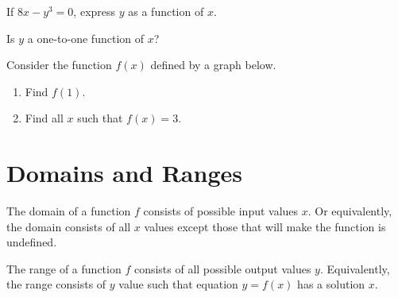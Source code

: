 \begin{exercise}
  If \(8x-y^3=0\), express \(y\) as a function of \(x\).

  Is $y$ a one-to-one function of $x$?
\end{exercise}


\begin{exercise}
  Consider the function $f(x)$ defined by a graph below.

  \begin{multicols}{2}
    \begin{enumerate}
      \item Find $f(1)$. 
      \item Find all $x$ such that $f(x)=3$.
    \end{enumerate}
    \vfill\mbox{}

    \columnbreak
   

  \end{multicols}
\end{exercise}
\vspace{-10\baselineskip}


\newpage
\thispagestyle{fancy}

\section{Domains and Ranges}
\begin{howto}
The domain of a function $f$ consists of possible input values $x$. Or equivalently, the domain consists of all $x$ values except those that will make the function is undefined.

The range of a function $f$ consists of all possible output values $y$. Equivalently, the range consists of $y$ value such that equation $y=f(x)$ has a solution $x$. 
\end{howto}

